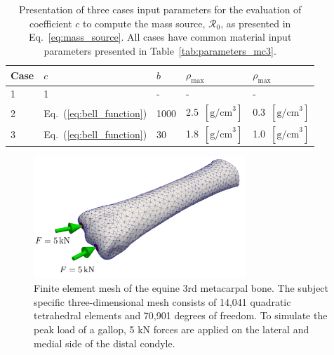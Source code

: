 \documentclass[11pt]{acmeArticle}
\numberwithin{equation}{section}
\begin{document}
\begin{table}[h]
	\centering
	\begin{tabular}{lllll}
		\hline
		Case                  & $c$              				       & $b$     &$\rho_\mathrm{max}$               &$\rho_\mathrm{max}$ \\ \hline
		1                     & 1              								 & -       & -                                & -\\
		2                     & Eq.~(\ref{eq:bell_function})   & 1000    & 2.5~$[{\text{g/cm}}^3]$          & 0.3~$[{\text{g/cm}}^3]$\\
		3                     & Eq.~(\ref{eq:bell_function})   & 30      & 1.8~$[{\text{g/cm}}^3]$          &1.0~$[{\text{g/cm}}^3]$ \\
		\hline
	\end{tabular} 
	\caption{Presentation of three cases input parameters for the evaluation of coefficient $c$ to compute the mass source, $\mathcal{R}_0$, as presented in Eq.~\ref{eq:mass_source}. All cases have common material input parameters presented in Table~\ref{tab:parameters_mc3}.}
	\label{tab:three_cases}
\end{table}


\begin{figure}[h!]
	\begin{centering}
		\includegraphics[width=8cm]{Figures/mc3_BC.png}
		\caption{Finite element mesh of the equine 3rd metacarpal bone. The subject specific three-dimensional mesh consists of 14,041 quadratic tetrahedral elements and 70,901 degrees of freedom. To simulate the peak load of a gallop, 5 kN forces are applied on the lateral and medial side of the distal condyle.}
		\label{fig:mc3_BC}
	\end{centering}
\end{figure}
\end{document}
